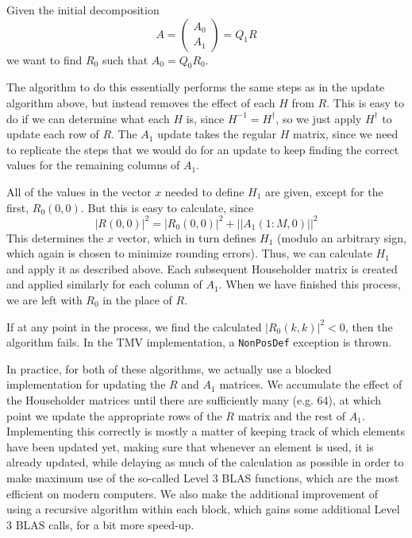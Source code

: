 \documentclass[twoside,letterpaper,11pt]{article}
\renewcommand{\tt}[1]{{\texttt {#1}}}
\begin{document}
Given the initial decomposition
\begin{equation*}
A = \left(\begin{array}{c}A_0 \\ A_1 \end{array}\right) = Q_1 R 
\end{equation*}
we want to find $R_0$ such that $A_0 = Q_0 R_0$.

The algorithm to do this essentially performs the same steps as in the update
algorithm above,
but instead removes the effect of each $H$ from $R$.
This is easy to
do if we can determine what each $H$ is, since $H^{-1} = H^\dagger$, so we just
apply $H^\dagger$ to update each row of $R$.  The $A_1$ update takes
the regular $H$ matrix, since we need to replicate the steps that we would do
for an update to keep finding the correct values for the remaining columns of $A_1$.

All of the values in the vector $x$ needed to define $H_1$ are given, except for the first,
$R_0(0,0)$.  But this is easy to calculate, since
\begin{equation*}
|R(0,0)|^2 = |R_0(0,0)|^2 + ||A_1(1:M,0)||^2
\end{equation*}
This determines the $x$ vector, which in turn defines $H_1$
(modulo an arbitrary sign, which again is chosen to minimize rounding errors).
Thus, we can calculate $H_1$ and apply it as described above.  Each subsequent Householder
matrix is created and applied similarly for each column of $A_1$.  When we have finished
this process, we are left with $R_0$ in the place of $R$.

If at any point in the process, we find the calculated $|R_0(k,k)|^2 < 0$, then 
the algorithm fails.  In the TMV implementation, a \tt{NonPosDef} exception is thrown.

In practice, for both of these algorithms, we actually use a blocked implementation for updating
the $R$ and $A_1$ matrices.  We accumulate the effect of the Householder matrices until 
there are sufficiently many (e.g. 64), at which point we update the appropriate rows of the $R$
matrix and the rest of $A_1$.  Implementing this correctly is mostly a matter of keeping track
of which elements have been updated yet, making sure that whenever an element is used,
it is already updated, while delaying as much of the calculation as possible in order 
to make maximum
use of the so-called Level 3 BLAS functions, which are the most efficient on modern computers.
We also make the additional improvement of using a recursive algorithm within each block,
which gains some additional Level 3 BLAS calls, for a bit more speed-up.
\end{document}
